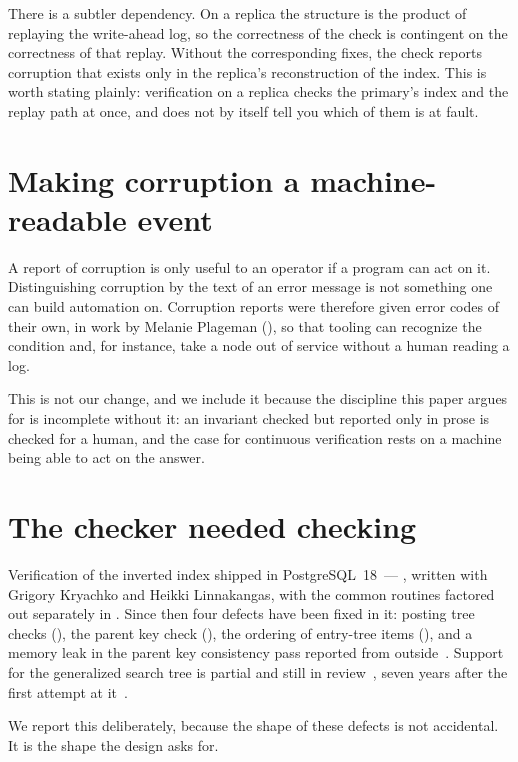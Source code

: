 There is a subtler dependency. On a replica the structure is the product of
replaying the write-ahead log, so the correctness of the check is contingent on
the correctness of that replay. Without the corresponding fixes, the check
reports corruption that exists only in the replica's reconstruction of the index.
This is worth stating plainly: verification on a replica checks the primary's
index and the replay path at once, and does not by itself tell you which of them
is at fault.

\section{Making corruption a machine-readable event}

A report of corruption is only useful to an operator if a program can act on it.
Distinguishing corruption by the text of an error message is not something one
can build automation on. Corruption reports were therefore given error codes of their own, in work by
Melanie Plageman (), so that tooling can recognize the
condition and, for instance, take a node out of service without a human reading
a log.

This is not our change, and we include it because the discipline this paper
argues for is incomplete without it: an invariant checked but reported only in
prose is checked for a human, and the case for continuous verification rests on
a machine being able to act on the answer.

\section{The checker needed checking}
\label{sec:checker}

Verification of the inverted index shipped in PostgreSQL~18~--- ,
written with Grigory Kryachko and Heikki Linnakangas, with the common routines
factored out separately in .
Since then four defects have been fixed in it: posting tree checks
(), the parent key check (), the ordering of
entry-tree items (), and a memory leak in the parent key
consistency pass reported from outside~\cite{thread-gin-amcheck-leak}. Support
for the generalized search tree is partial and still in
review~\cite{thread-amcheck-gist-2025}, seven years after the first attempt at
it~\cite{thread-amcheck-gist-2018}.

We report this deliberately, because the shape of these defects is not
accidental. It is the shape the design asks for.

